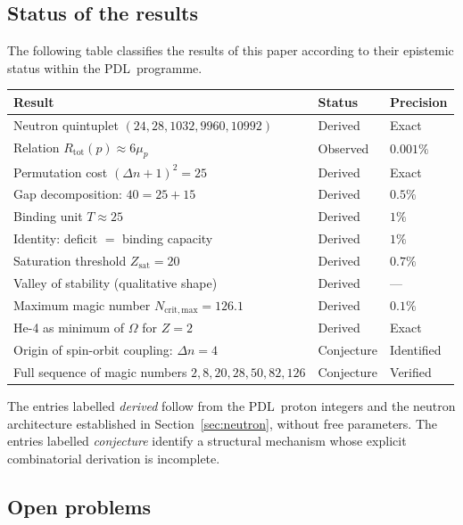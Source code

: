 \documentclass[11pt,a4paper]{article}
\theoremstyle{definition}
\newcommand{\PDL}{\textnormal{PDL}}
\newcommand{\Rtot}{R_{\mathrm{tot}}}
\newcommand{\Zsat}{Z_{\mathrm{sat}}}
\begin{document}
\subsection{Status of the results}
\label{subsec:status}

The following table classifies the results of this paper according to their epistemic status within the \PDL\ programme.

\begin{center}
\begin{tabular}{lll}
\hline
Result & Status & Precision \\
\hline
Neutron quintuplet $(24,28,1032,9960,10992)$ & Derived & Exact \\
Relation $\Rtot(p) \approx 6\mu_p$ & Observed & $0.001\%$ \\
Permutation cost $(\Delta n+1)^2 = 25$ & Derived & Exact \\
Gap decomposition: $40 = 25 + 15$ & Derived & $0.5\%$ \\
Binding unit $T \approx 25$ & Derived & $1\%$ \\
Identity: deficit $=$ binding capacity & Derived & $1\%$ \\
Saturation threshold $\Zsat = 20$ & Derived & $0.7\%$ \\
Valley of stability (qualitative shape) & Derived & --- \\
Maximum magic number $N_{\mathrm{crit,max}} = 126.1$ & Derived & $0.1\%$ \\
He-4 as minimum of $\Omega$ for $Z=2$ & Derived & Exact \\
Origin of spin-orbit coupling: $\Delta n = 4$ & Conjecture & Identified \\
Full sequence of magic numbers $2,8,20,28,50,82,126$ & Conjecture & Verified \\
\hline
\end{tabular}
\end{center}

\medskip\noindent The entries labelled \emph{derived} follow from the \PDL\ proton integers and the neutron architecture established in Section~\ref{sec:neutron}, without free parameters. The entries labelled \emph{conjecture} identify a structural mechanism whose explicit combinatorial derivation is incomplete.

\subsection{Open problems}
\label{subsec:open}
\end{document}
